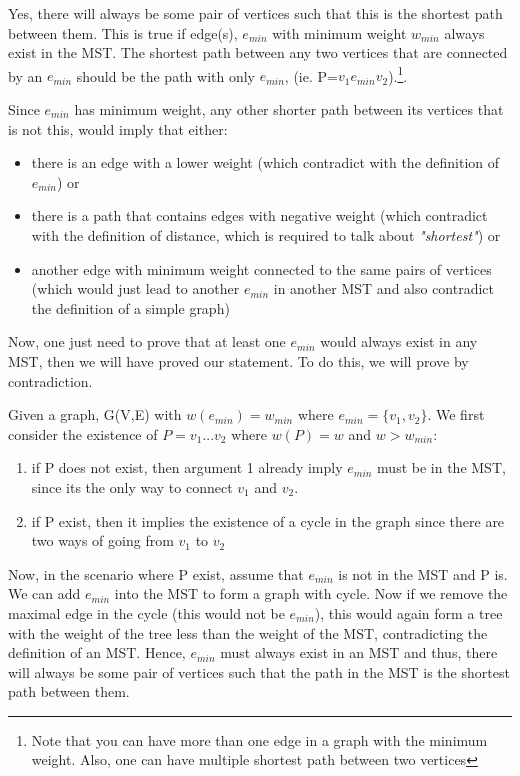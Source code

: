 \documentclass[nobib]{tufte-handout}
\begin{document}
\begin{enumerate}
    Yes, there will always be some pair of vertices such that this is the shortest path between them. This is true if edge(s), $e_{min}$ with minimum weight $w_{min}$ always exist in the MST. The shortest path between any two vertices that are connected by an $e_{min}$ should be the path with only $e_{min}$, (ie. P=$v_1e_{min}v_2$).\footnote{Note that you can have more than one edge in a graph with the minimum weight. Also, one can have multiple shortest path between two vertices}.
    
    Since $e_{min}$ has minimum weight, any other shorter path between its vertices that is not this, would imply that either:
    \begin{itemize}
        \item there is an edge with a lower weight (which contradict with the definition of $e_{min}$) or
        \item there is a path that contains edges with negative weight (which contradict with the definition of distance, which is required to talk about \textit{"shortest"}) or
        \item another edge with minimum weight connected to the same pairs of vertices (which would just lead to another $e_{min}$ in another MST and also contradict the definition of a simple graph)
    \end{itemize}
    Now, one just need to prove that at least one $e_{min}$ would always exist in any MST, then we will have proved our statement. To do this, we will prove by contradiction.
    
    Given a graph, G(V,E) with $w(e_{min}) = w_{min}$ where $e_{min} =\{v_1,v_2\}$. We first consider the existence of $P=v_1 ... v_2$ where $w(P) = w$ and $w > w_{min}$: 
    \begin{enumerate}
        \item if P does not exist, then argument 1 already imply $e_{min}$ must be in the MST, since its the only way to connect $v_1 $ and $ v_2$.
        \item if P exist, then it implies the existence of a cycle in the graph since there are two ways of going from $v_1$ to $v_2$
    \end{enumerate}
    
    Now, in the scenario where P exist, assume that $e_{min}$ is not in the MST and P is. We can add $e_{min}$ into the MST to form a graph with cycle. Now if we remove the maximal edge in the cycle (this would not be $e_{min}$), this would again form a tree with the weight of the tree less than the weight of the MST, contradicting the definition of an MST. Hence, $e_{min}$ must always exist in an MST and thus, there will always be some pair of vertices such that the path in the MST is the shortest path between them.
    
\end{enumerate}
\newpage
\end{document}
